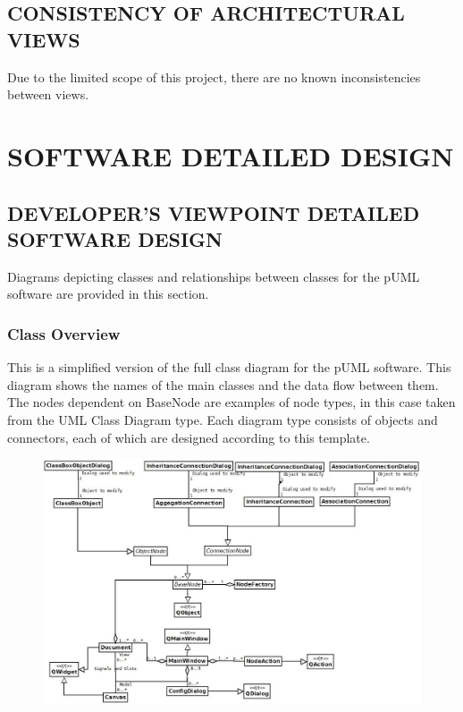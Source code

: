 \documentclass[twoside,letterpaper]{article}
\begin{document}
{\subsection[CONSISTENCY OF ARCHITECTURAL VIEWS]
{\bfseries CONSISTENCY OF ARCHITECTURAL VIEWS}
{
Due to the limited scope of this project, there are no known inconsistencies between views. 
}


\clearpage
\section{SOFTWARE DETAILED DESIGN}

\bigskip

\subsection[\ DEVELOPER{\textquoteright}S VIEWPOINT DETAILED SOFTWARE DESIGN]
{DEVELOPER{\textquoteright}S VIEWPOINT DETAILED SOFTWARE DESIGN }
{
Diagrams depicting classes and relationships between classes for the pUML software are provided in this section.
}

\subsubsection[\ Class Overview]
{\bfseries Class Overview}
{
This is a simplified version of the full class diagram for the pUML software.  This diagram shows the names of the main classes and the data flow between them. \newline
The nodes dependent on BaseNode are examples of node types, in this case taken from the UML Class Diagram type.  Each diagram type consists of objects and connectors, each of which are designed according to this template.
}
  \begin{figure}[h]
  \centering
  \includegraphics[width=6.5in]{class_simple.jpeg}
  \end{figure}


}
\end{document}
